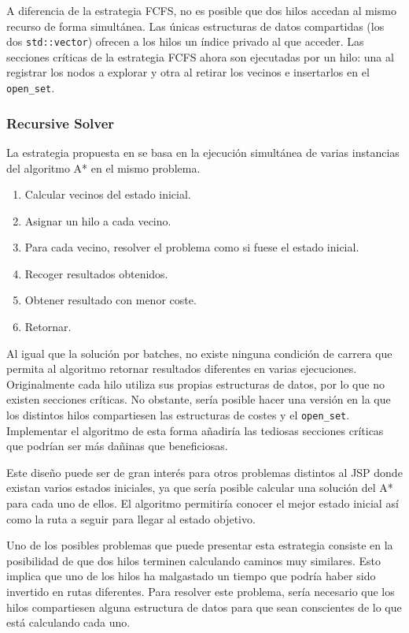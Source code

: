 A diferencia de la estrategia FCFS,
no es posible que dos hilos accedan al mismo recurso
de forma simultánea.
Las únicas estructuras de datos compartidas
(los dos \lstinline{std::vector})
ofrecen a los hilos un índice privado al que acceder.
Las secciones críticas de la estrategia FCFS
ahora son ejecutadas por un hilo:
una al registrar los nodos a explorar y
otra al retirar los vecinos e insertarlos en el \lstinline{open_set}.

\subsubsection{Recursive Solver}

La estrategia propuesta en \cite{Zag17} se basa en la ejecución
simultánea de varias instancias del algoritmo A* en el mismo problema.
\begin{enumerate}[start=0, itemsep=0.25px]
    \item Calcular vecinos del estado inicial.
    \item Asignar un hilo a cada vecino.
    \item Para cada vecino, resolver el problema como si fuese el estado inicial.
    \item Recoger resultados obtenidos.
    \item Obtener resultado con menor coste.
    \item Retornar.
\end{enumerate}

Al igual que la solución por batches,
no existe ninguna condición de carrera que permita
al algoritmo retornar resultados diferentes
en varias ejecuciones.
Originalmente cada hilo utiliza sus propias estructuras
de datos, por lo que no existen secciones críticas.
No obstante, sería posible hacer una versión en la que
los distintos hilos compartiesen las estructuras de costes
y el \lstinline{open_set}.
Implementar el algoritmo de esta forma añadiría las
tediosas secciones críticas que podrían ser más
dañinas que beneficiosas.

Este diseño puede ser de gran interés para otros problemas
distintos al JSP donde existan varios estados iniciales,
ya que sería posible calcular una solución del A*
para cada uno de ellos.
El algoritmo permitiría conocer el mejor estado inicial
así como la ruta a seguir para llegar al estado objetivo.

Uno de los posibles problemas que puede presentar esta
estrategia consiste en la posibilidad de que dos hilos
terminen calculando caminos muy similares.
Esto implica que uno de los hilos ha malgastado un tiempo
que podría haber sido invertido en rutas diferentes.
Para resolver este problema, sería necesario que
los hilos compartiesen alguna estructura de datos
para que sean conscientes de lo que está calculando cada uno.

